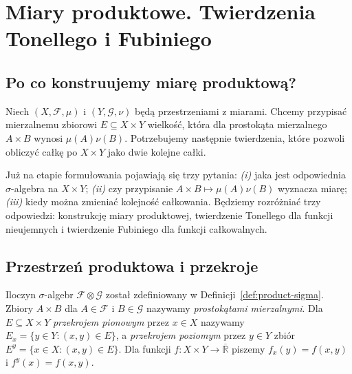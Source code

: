 \chapter{Miary produktowe. Twierdzenia Tonellego i Fubiniego}
\label{ch:produkty-miary}

\providecommand{\atlasref}[2]{#2}


\section{Po co konstruujemy miarę produktową?}

Niech $(X,\mathcal F,\mu)$ i $(Y,\mathcal G,\nu)$ będą
przestrzeniami z miarami. Chcemy przypisać mierzalnemu
zbiorowi $E\subseteq X\times Y$ wielkość, która dla
prostokąta mierzalnego $A\times B$ wynosi $\mu(A)\nu(B)$.
Potrzebujemy następnie twierdzenia, które pozwoli obliczyć
całkę po $X\times Y$ jako dwie kolejne całki.

Już na etapie formułowania pojawiają się trzy pytania:
\emph{(i)} jaka jest odpowiednia $\sigma$-algebra
na $X\times Y$; \emph{(ii)} czy przypisanie
$A\times B\mapsto\mu(A)\nu(B)$ wyznacza miarę;
\emph{(iii)} kiedy można zmieniać kolejność całkowania.
Będziemy rozróżniać trzy odpowiedzi: konstrukcję miary
produktowej, twierdzenie Tonellego dla funkcji nieujemnych
i twierdzenie Fubiniego dla funkcji całkowalnych.

\section{Przestrzeń produktowa i przekroje}

Iloczyn $\sigma$-algebr $\mathcal F\otimes\mathcal G$
został zdefiniowany w Definicji~\ref{def:product-sigma}.
Zbiory $A\times B$ dla $A\in\mathcal F$ i $B\in\mathcal G$
nazywamy \emph{prostokątami mierzalnymi}.
Dla $E\subseteq X\times Y$ \emph{przekrojem pionowym}
przez $x\in X$ nazywamy $E_x=\{y\in Y:(x,y)\in E\}$,
a \emph{przekrojem poziomym} przez $y\in Y$ zbiór
$E^y=\{x\in X:(x,y)\in E\}$.
Dla funkcji $f:X\times Y\to\overline{\mathbb R}$ piszemy
$f_x(y)=f(x,y)$ i $f^y(x)=f(x,y)$.

